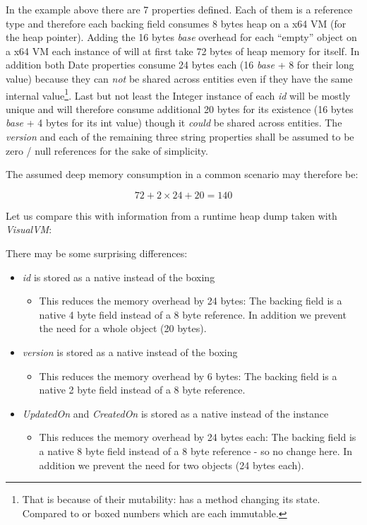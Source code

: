 In the example above there are 7 properties defined. Each of them is a reference type and therefore each backing field consumes 8 bytes heap on a x64 VM (for the heap pointer). Adding the 16 bytes \textit{base} overhead for each ``empty'' object on a x64 VM each instance of  will at first take 72 bytes of heap memory for itself. In addition both Date properties consume 24 bytes each (16 \textit{base} + 8 for their long value) because they can \emph{not} be shared across entities even if they have the same internal value\footnote{That is because of their mutability:  has a method  changing its state. Compared to  or boxed numbers which are each immutable.}. Last but not least the Integer instance of each \emph{id} will be mostly unique and will therefore consume additional 20 bytes for its existence (16 bytes \textit{base} + 4 bytes for its int value) though it \emph{could} be shared across entities. The \emph{version} and each of the remaining three string properties shall be assumed to be zero / null references for the sake of simplicity.\newline

The assumed deep memory consumption in a common scenario may therefore be:

\[72+2\times24+20=140\]

Let us compare this with information from a runtime heap dump taken with \textit{VisualVM}:

\def\showimgref{img/visualvm-queryentity}

There may be some surprising differences:
\begin{itemize}
	\item \emph{id} is stored as a native  instead of the boxing 
		\begin{itemize}
			\item This reduces the memory overhead by 24 bytes: The backing field is a native 4 byte field instead of a 8 byte reference. In addition we prevent the need for a whole  object (20 bytes).
		\end{itemize}
	\item \emph{version} is stored as a native  instead of the boxing 
		\begin{itemize}
			\item This reduces the memory overhead by 6 bytes: The backing field is a native 2 byte field instead of a 8 byte reference.
		\end{itemize}
	\item \emph{UpdatedOn} and \emph{CreatedOn} is stored as a native  instead of the  instance
		\begin{itemize}
			\item This reduces the memory overhead by 24 bytes each: The backing field is a native 8 byte field instead of a 8 byte reference - so no change here. In addition we prevent the need for two  objects (24 bytes each).
		\end{itemize}
\end{itemize}

